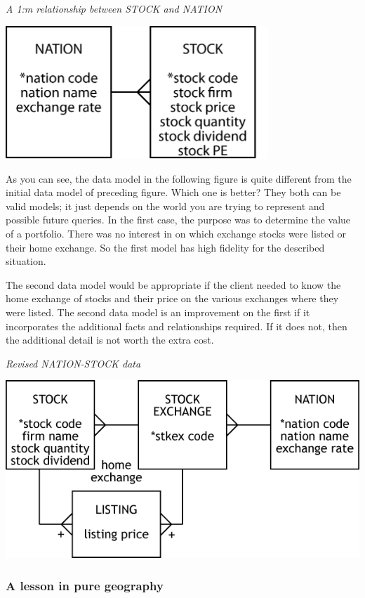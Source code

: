 \documentclass[
]{article}
\begin{document}
\emph{A 1:m relationship between STOCK and NATION}

\includegraphics[width=3.89583in,height=\textheight]{Figures/Chapter 4/nation-stock.png}

As you can see, the data model in the following figure is quite
different from the initial data model of preceding figure. Which one is
better? They both can be valid models; it just depends on the world you
are trying to represent and possible future queries. In the first case,
the purpose was to determine the value of a portfolio. There was no
interest in on which exchange stocks were listed or their home exchange.
So the first model has high fidelity for the described situation.

The second data model would be appropriate if the client needed to know
the home exchange of stocks and their price on the various exchanges
where they were listed. The second data model is an improvement on the
first if it incorporates the additional facts and relationships
required. If it does not, then the additional detail is not worth the
extra cost.

\emph{Revised NATION-STOCK data}

\includegraphics{Figures/Chapter 7/revised NATION-STOCK.png}

\hypertarget{a-lesson-in-pure-geography}{%
\subsubsection*{A lesson in pure geography}\label{a-lesson-in-pure-geography}}
\end{document}
